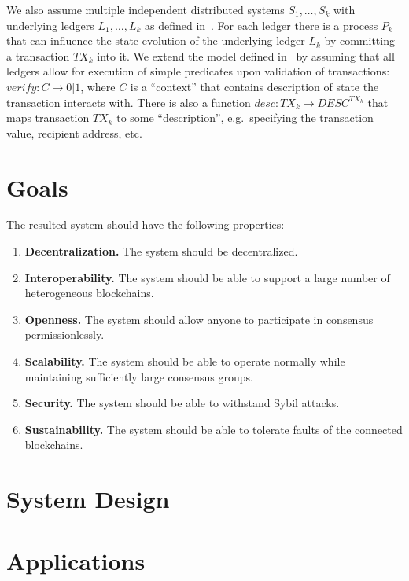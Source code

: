 \documentclass{article}
\begin{document}
\begin{sloppypar}
        We also assume multiple independent distributed systems ${S_1, \dots, S_k}$ with underlying ledgers ${L_1, \dots, L_k}$ as defined in~\cite{cryptoeprint:2019/1128}.
        For each ledger there is a process $P_k$ that can influence the state evolution of the underlying ledger $L_k$ by committing a transaction $TX_k$ into it.
        We extend the model defined in~\cite{cryptoeprint:2019/1128} by assuming that all ledgers allow for execution of simple predicates upon validation of transactions:
        ${verify: C \rightarrow 0 | 1}$, where $C$ is a \enquote{context} that contains description of state the transaction interacts with.
        There is also a function ${desc: TX_k \rightarrow DESC^{TX_k}}$ that maps transaction $TX_k$ to some \enquote{description}, e.g.\ specifying the transaction value, recipient address, etc.


        \section{Goals}\label{sec:goals}

        The resulted system should have the following properties:
        \begin{enumerate}
            \item \textbf{Decentralization.} The system should be decentralized.
            \item \textbf{Interoperability.} The system should be able to support a large number of heterogeneous blockchains.
            \item \textbf{Openness.} The system should allow anyone to participate in consensus permissionlessly.
            \item \textbf{Scalability.} The system should be able to operate normally while maintaining sufficiently large consensus groups.
            \item \textbf{Security.} The system should be able to withstand Sybil attacks.
            \item \textbf{Sustainability.} The system should be able to tolerate faults of the connected blockchains.
        \end{enumerate}


        \section{System Design}\label{sec:system-design}
        


        \section{Applications}\label{sec:applications}


\end{sloppypar}
\end{document}
